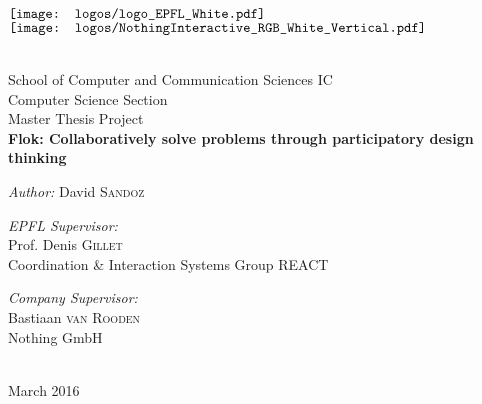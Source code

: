 \pagecolor{rocketorange}
\color{white}

\begin{titlepage}

\begin{center}

\begin{minipage}{6in}
  \centering
  $\vcenter{\hbox{\texttt{[image: logos/logo\_EPFL\_White.pdf]}}}$
  \hspace*{2cm}
  $\vcenter{\hbox{\texttt{[image: logos/NothingInteractive\_RGB\_White\_Vertical.pdf]}}}$
\end{minipage}\\[2 cm]

{\large School of Computer and Communication Sciences IC}\\[0.5cm]
{\large Computer Science Section}\\[0.5cm]
{\Large Master Thesis Project}\\[0.5cm]


\vspace{1cm}
{\huge \bfseries Flok: Collaboratively solve problems through participatory design thinking}\\[0.4cm]

\vspace{1.5cm}

\large \emph{Author:} David \textsc{Sandoz}\\[1.5cm]

\begin{minipage}{0.5\textwidth}
\begin{flushleft} \large
\emph{EPFL Supervisor:}\\
Prof. Denis \textsc{Gillet}\\
Coordination \& Interaction Systems Group REACT
\end{flushleft}
\end{minipage}
\begin{minipage}{0.4\textwidth}
\begin{flushright} \large
\emph{Company Supervisor:}\\
Bastiaan \textsc{van Rooden}\\
Nothing GmbH\\
~
\end{flushright}
\end{minipage}

\vfill

{\large March 2016}

\end{center}

\end{titlepage}

\pagecolor{white}
\color{black}
